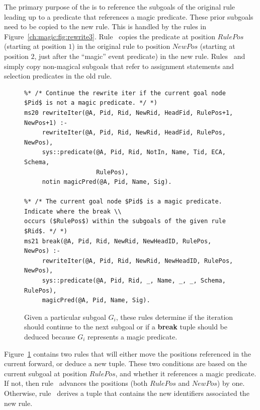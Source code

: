 The primary purpose of the  is to reference the subgoals of the
original rule leading up to a predicate that references a magic predicate.
These prior subgoals need to be copied to the new rule.  This is
handled by the rules in Figure~\ref{ch:magic:fig:rewrite3}.  Rule~
copies the predicate at position $RulePos$ (starting at position $1$) in the
original rule to position $NewPos$ (starting at position $2$, just after the
``magic'' event predicate) in the new rule.  Rules~ and
 simply copy non-magical subgoals that refer to assignment statements
and selection predicates in the old rule.


\begin{figure}[!t]
\ssp
\centering
\begin{lstlisting}
%* /* Continue the rewrite iter if the current goal node $Pid$ is not a magic predicate. */ *)
ms20 rewriteIter(@A, Pid, Rid, NewRid, HeadFid, RulePos+1, NewPos+1) :-
     rewriteIter(@A, Pid, Rid, NewRid, HeadFid, RulePos, NewPos),
     sys::predicate(@A, Pid, Rid, NotIn, Name, Tid, ECA, Schema, 
                    RulePos),
     notin magicPred(@A, Pid, Name, Sig).

%* /* The current goal node $Pid$ is a magic predicate. Indicate where the break \\
occurs ($RulePos$) within the subgoals of the given rule $Rid$. */ *)
ms21 break(@A, Pid, Rid, NewRid, NewHeadID, RulePos, NewPos) :-
     rewriteIter(@A, Pid, Rid, NewRid, NewHeadID, RulePos, NewPos),
     sys::predicate(@A, Pid, Rid, _, Name, _, _, Schema, RulePos),
     magicPred(@A, Pid, Name, Sig).
\end{lstlisting}
\caption{\label{ch:magic:fig:rewrite4} Given a particular subgoal $G_i$, these rules determine
if the iteration should continue to the next subgoal or if a {\bf break} tuple should be
deduced because $G_i$ represents a magic predicate. }
\end{figure}

Figure~\ref{ch:magic:fig:rewrite4} contains two rules that will either move the
positions referenced in the current  forward, or deduce a new
 tuple.  These two conditions are based on the current subgoal at
position $RulePos$, and whether it references a magic predicate.  If not, then
rule~ advances the  positions (both $RulePos$ and
$NewPos$) by one.  Otherwise, rule~ derives a  tuple that
contains the new identifiers associated the new rule.

